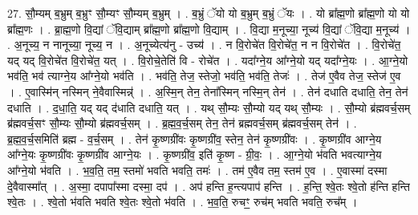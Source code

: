 \documentclass[17pt]{extarticle}
\begin{document}
27. सौ॒म्यम् ब॒भ्रुम् ब॒भ्रुꣳ सौ॒म्यꣳ सौ॒म्यम् ब॒भ्रुम् । . ब॒भ्रुं ॅयो यो ब॒भ्रुम् ब॒भ्रुं ॅयः । . यो ब्रा᳚ह्म॒णो ब्रा᳚ह्म॒णो यो यो ब्रा᳚ह्म॒णः । . ब्रा॒ह्म॒णो वि॒द्यां ॅवि॒द्याम् ब्रा᳚ह्म॒णो ब्रा᳚ह्म॒णो वि॒द्याम् । . वि॒द्या म॒नूच्या॒ नूच्य॑ वि॒द्यां ॅवि॒द्या म॒नूच्य॑ । . अ॒नूच्य॒ न नानूच्या॒ नूच्य॒ न । . अ॒नूच्येत्य॑नु - उच्य॑ । . न वि॒रोचे॑त वि॒रोचे॑त॒ न न वि॒रोचे॑त । . वि॒रोचे॑त॒ यद् यद् वि॒रोचे॑त वि॒रोचे॑त॒ यत् । . वि॒रोचे॒तेति॑ वि - रोचे॑त । . यदा᳚ग्ने॒य आ᳚ग्ने॒यो यद् यदा᳚ग्ने॒यः । . आ॒ग्ने॒यो भव॑ति॒ भव॑ त्याग्ने॒य आ᳚ग्ने॒यो भव॑ति । . भव॑ति॒ तेज॒ स्तेजो॒ भव॑ति॒ भव॑ति॒ तेजः॑ । . तेज॑ ए॒वैव तेज॒ स्तेज॑ ए॒व । . ए॒वास्मि॑न् नस्मिन् ने॒वैवास्मिन्न्॑ । . अ॒स्मि॒न् तेन॒ तेना᳚स्मिन् नस्मि॒न् तेन॑ । . तेन॑ दधाति दधाति॒ तेन॒ तेन॑ दधाति । . द॒धा॒ति॒ यद् यद् द॑धाति दधाति॒ यत् । . यथ् सौ॒म्यः सौ॒म्यो यद् यथ् सौ॒म्यः । . सौ॒म्यो ब्र॑ह्मवर्च॒सम् ब्र॑ह्मवर्च॒सꣳ सौ॒म्यः सौ॒म्यो ब्र॑ह्मवर्च॒सम् । . ब्र॒ह्म॒व॒र्च॒सम् तेन॒ तेन॑ ब्रह्मवर्च॒सम् ब्र॑ह्मवर्च॒सम् तेन॑ । . ब्र॒ह्म॒व॒र्च॒समिति॑ ब्रह्म - व॒र्च॒सम् । . तेन॑ कृ॒ष्णग्री॑वः कृ॒ष्णग्री॑व॒ स्तेन॒ तेन॑ कृ॒ष्णग्री॑वः । . कृ॒ष्णग्री॑व आग्ने॒य आ᳚ग्ने॒यः कृ॒ष्णग्री॑वः कृ॒ष्णग्री॑व आग्ने॒यः । . कृ॒ष्णग्री॑व॒ इति॑ कृ॒ष्ण - ग्री॒वः॒ । . आ॒ग्ने॒यो भ॑वति भवत्याग्ने॒य आ᳚ग्ने॒यो भ॑वति । . भ॒व॒ति॒ तम॒ स्तमो॑ भवति भवति॒ तमः॑ । . तम॑ ए॒वैव तम॒ स्तम॑ ए॒व । . ए॒वास्मा॑ दस्मा दे॒वैवास्मा᳚त् । . अ॒स्मा॒ दपापा᳚स्मा दस्मा॒ दप॑ । . अप॑ हन्ति ह॒न्त्यपाप॑ हन्ति । . ह॒न्ति॒ श्वे॒तः श्वे॒तो ह॑न्ति हन्ति श्वे॒तः । . श्वे॒तो भ॑वति भवति श्वे॒तः श्वे॒तो भ॑वति । . भ॒व॒ति॒ रुचꣳ॒॒ रुच॑म् भवति भवति॒ रुच᳚म् । \newline
\end{document}
